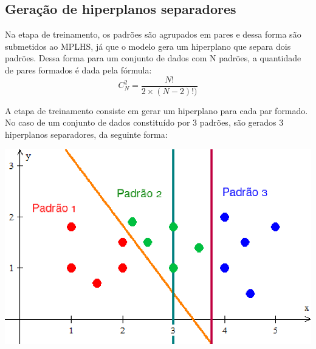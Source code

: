 \subsection{Geração de hiperplanos separadores}
Na etapa de treinamento, os padrões são agrupados em pares e dessa forma são submetidos ao MPLHS, já que o modelo gera um hiperplano que separa dois padrões. Dessa forma para um conjunto de dados com N padrões, a quantidade de pares formados é dada pela fórmula:
$$ C_{N}^{2}=\frac{N!}{2\times (N-2)!)} $$

A etapa de treinamento consiste em gerar um hiperplano para cada par formado. No caso de um conjunto de dados constituído por 3 padrões, são gerados 3 hiperplanos separadores, da seguinte forma:

\begin{center}
	\includegraphics[scale=0.5]{graficos/class123}
	\label{img:classificadores}
\end{center}

